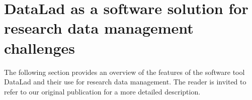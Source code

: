 
\section{DataLad as a software solution for research data management challenges}

	The following section provides an overview of the features of the software tool DataLad and their use for research data management.
	The reader is invited to refer to our original publication \citep{Halchenko2021} for a more detailed description.%


